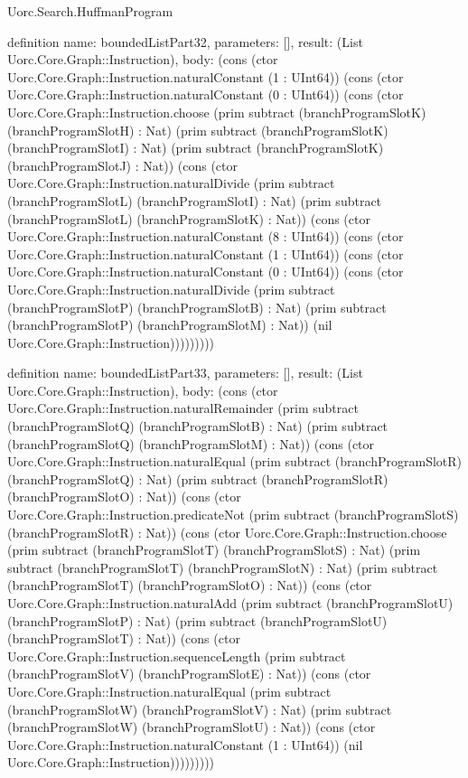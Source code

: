 \begin{lexlean}{Uorc.Search.HuffmanProgram}
\begin{semanticmodule}
definition{
  name: boundedListPart32,
  parameters: [],
  result: (List Uorc.Core.Graph::Instruction),
  body: (cons (ctor Uorc.Core.Graph::Instruction.naturalConstant (1 : UInt64)) (cons (ctor Uorc.Core.Graph::Instruction.naturalConstant (0 : UInt64)) (cons (ctor Uorc.Core.Graph::Instruction.choose (prim subtract (branchProgramSlotK) (branchProgramSlotH) : Nat) (prim subtract (branchProgramSlotK) (branchProgramSlotI) : Nat) (prim subtract (branchProgramSlotK) (branchProgramSlotJ) : Nat)) (cons (ctor Uorc.Core.Graph::Instruction.naturalDivide (prim subtract (branchProgramSlotL) (branchProgramSlotI) : Nat) (prim subtract (branchProgramSlotL) (branchProgramSlotK) : Nat)) (cons (ctor Uorc.Core.Graph::Instruction.naturalConstant (8 : UInt64)) (cons (ctor Uorc.Core.Graph::Instruction.naturalConstant (1 : UInt64)) (cons (ctor Uorc.Core.Graph::Instruction.naturalConstant (0 : UInt64)) (cons (ctor Uorc.Core.Graph::Instruction.naturalDivide (prim subtract (branchProgramSlotP) (branchProgramSlotB) : Nat) (prim subtract (branchProgramSlotP) (branchProgramSlotM) : Nat)) (nil Uorc.Core.Graph::Instruction)))))))))
}

definition{
  name: boundedListPart33,
  parameters: [],
  result: (List Uorc.Core.Graph::Instruction),
  body: (cons (ctor Uorc.Core.Graph::Instruction.naturalRemainder (prim subtract (branchProgramSlotQ) (branchProgramSlotB) : Nat) (prim subtract (branchProgramSlotQ) (branchProgramSlotM) : Nat)) (cons (ctor Uorc.Core.Graph::Instruction.naturalEqual (prim subtract (branchProgramSlotR) (branchProgramSlotQ) : Nat) (prim subtract (branchProgramSlotR) (branchProgramSlotO) : Nat)) (cons (ctor Uorc.Core.Graph::Instruction.predicateNot (prim subtract (branchProgramSlotS) (branchProgramSlotR) : Nat)) (cons (ctor Uorc.Core.Graph::Instruction.choose (prim subtract (branchProgramSlotT) (branchProgramSlotS) : Nat) (prim subtract (branchProgramSlotT) (branchProgramSlotN) : Nat) (prim subtract (branchProgramSlotT) (branchProgramSlotO) : Nat)) (cons (ctor Uorc.Core.Graph::Instruction.naturalAdd (prim subtract (branchProgramSlotU) (branchProgramSlotP) : Nat) (prim subtract (branchProgramSlotU) (branchProgramSlotT) : Nat)) (cons (ctor Uorc.Core.Graph::Instruction.sequenceLength (prim subtract (branchProgramSlotV) (branchProgramSlotE) : Nat)) (cons (ctor Uorc.Core.Graph::Instruction.naturalEqual (prim subtract (branchProgramSlotW) (branchProgramSlotV) : Nat) (prim subtract (branchProgramSlotW) (branchProgramSlotU) : Nat)) (cons (ctor Uorc.Core.Graph::Instruction.naturalConstant (1 : UInt64)) (nil Uorc.Core.Graph::Instruction)))))))))
}


\end{semanticmodule}
\end{lexlean}
